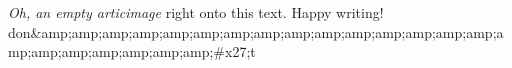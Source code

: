 \textit{Oh, an empty articimage} right onto this text. Happy writing! 
don&amp;amp;amp;amp;amp;amp;amp;amp;amp;amp;amp;amp;amp;amp;amp;amp;amp;amp;amp;amp;amp;amp;#x27;t